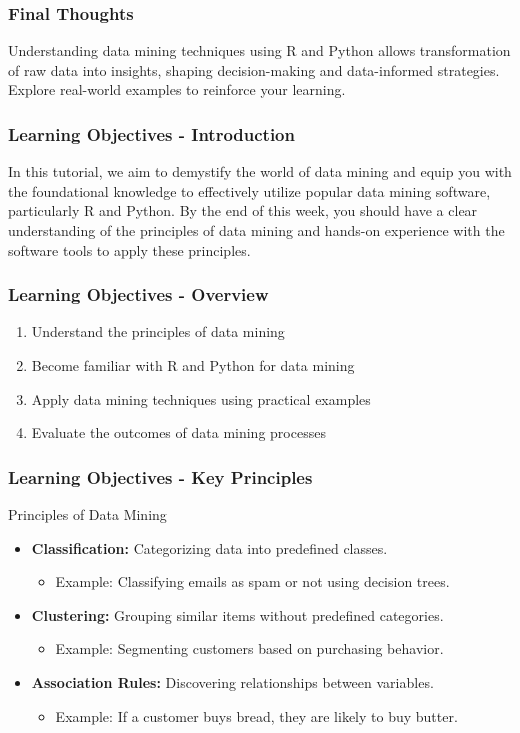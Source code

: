 \documentclass[aspectratio=169]{beamer}
\begin{document}
\begin{frame}[fragile]
    \frametitle{Final Thoughts}
    Understanding data mining techniques using R and Python allows transformation of raw data into insights, shaping decision-making and data-informed strategies. Explore real-world examples to reinforce your learning.
\end{frame}

\begin{frame}[fragile]
    \frametitle{Learning Objectives - Introduction}
    In this tutorial, we aim to demystify the world of data mining and equip you with the foundational knowledge to effectively utilize popular data mining software, particularly R and Python. By the end of this week, you should have a clear understanding of the principles of data mining and hands-on experience with the software tools to apply these principles.
\end{frame}

\begin{frame}[fragile]
    \frametitle{Learning Objectives - Overview}
    \begin{enumerate}
        \item Understand the principles of data mining
        \item Become familiar with R and Python for data mining
        \item Apply data mining techniques using practical examples
        \item Evaluate the outcomes of data mining processes
    \end{enumerate}
\end{frame}

\begin{frame}[fragile]
    \frametitle{Learning Objectives - Key Principles}
    \begin{block}{Principles of Data Mining}
        \begin{itemize}
            \item \textbf{Classification:} Categorizing data into predefined classes. 
                \begin{itemize}
                    \item Example: Classifying emails as spam or not using decision trees.
                \end{itemize}
            \item \textbf{Clustering:} Grouping similar items without predefined categories.
                \begin{itemize}
                    \item Example: Segmenting customers based on purchasing behavior.
                \end{itemize}
            \item \textbf{Association Rules:} Discovering relationships between variables.
                \begin{itemize}
                    \item Example: If a customer buys bread, they are likely to buy butter.
                \end{itemize}
        \end{itemize}
    \end{block}
\end{frame}
\end{document}
